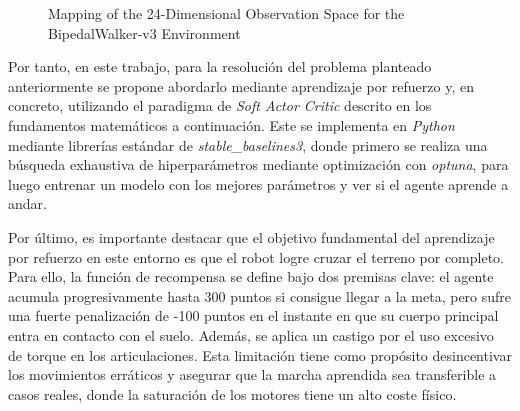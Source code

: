 \documentclass[11pt,a4paper]{article}
\begin{document}
\begin{figure}[H]
{%
	}
	\shorthandon{>} 
	\caption{Mapping of the 24-Dimensional Observation Space for the BipedalWalker-v3 Environment}
	\label{fig:bipedal_walker_obs}
\end{figure}

Por tanto, en este trabajo, para la resolución del problema planteado anteriormente se propone abordarlo mediante aprendizaje por refuerzo y, en concreto, utilizando el paradigma de \textit{Soft Actor Critic} descrito en los fundamentos matemáticos a continuación. Este se implementa en \textit{Python} mediante librerías estándar de \textit{stable\_baselines3}, donde primero se realiza una búsqueda exhaustiva de hiperparámetros mediante optimización con \textit{optuna}, para luego entrenar un modelo con los mejores parámetros y ver si el agente aprende a andar.
\newline

Por último, es importante destacar que el objetivo fundamental del aprendizaje por refuerzo en este entorno es que el robot logre cruzar el terreno por completo. Para ello, la función de recompensa se define bajo dos premisas clave: el agente acumula progresivamente hasta 300 puntos si consigue llegar a la meta, pero sufre una fuerte penalización de -100 puntos en el instante en que su cuerpo principal entra en contacto con el suelo. Además, se aplica un castigo por el uso excesivo de torque en los articulaciones. Esta limitación tiene como propósito desincentivar los movimientos erráticos y asegurar que la marcha aprendida sea transferible a casos reales, donde la saturación de los motores tiene un alto coste físico.
\end{document}
